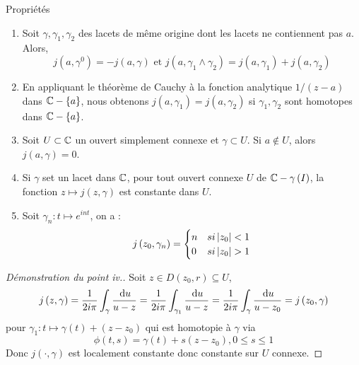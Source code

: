 \documentclass{cours}
\begin{document}
\begin{propositionfr}{Propriétés}{}
    \begin{enumerate}
        \item Soit $\gamma, \gamma_{1}, \gamma_{2}$ des lacets de même origine dont les lacets ne contiennent pas $a$. Alors,
        \begin{equation*}
            j\left(a, \gamma^{0}\right) = -j\left(a, \gamma\right) \text{ et } j\left(a, \gamma_{1} \land \gamma_{2}\right) = j\left(a, \gamma_{1}\right) + j\left(a, \gamma_{2}\right)
        \end{equation*}
        \item En appliquant le théorème de Cauchy à la fonction analytique $1/\left(z - a\right)$ dans $\mathbb{C} - \{a\}$, nous obtenons $j\left(a, \gamma_{1}\right) = j\left(a, \gamma_{2}\right)$ si $\gamma_{1}, \gamma_{2}$ sont homotopes dans $\mathbb{C} - \{a\}$.
        \item Soit $U \subset \mathbb{C}$ un ouvert simplement connexe et $\gamma \subset U$. Si $a \notin U$, alors $j\left(a, \gamma\right) = 0$.
        \item Si $\gamma$ set un lacet dans $\mathbb{C}$, pour tout ouvert connexe $U$ de $\mathbb{C} - \gamma\left(I\right)$, la fonction $z \mapsto j\left(z, \gamma\right)$ est constante dans $U$.
        \item Soit $\gamma_{n} : t \mapsto e^{int}$, on a : 
        \begin{equation*}
            j\left(z_{0}, \gamma_{n}\right) = \begin{cases}
                n & si \left|z_{0}\right| < 1\\
                0 & si \left|z_{0}\right| > 1
            \end{cases}
        \end{equation*}
    \end{enumerate}
\end{propositionfr}
\begin{proof}[Démonstration du point iv.]
    Soit $z \in D\left(z_{0}, r\right) \subseteq U$, 
    \begin{equation*}
        j\left(z, \gamma\right) = \frac{1}{2i\pi}\int_{\gamma}\frac{{\rm \, d} u}{u - z} = \frac{1}{2i\pi}\int_{\gamma_{1}}\frac{{\rm \, d} u}{u - z} = \frac{1}{2i\pi}\int_{\gamma}\frac{{\rm \, d} u}{u - z_{0}} = j\left(z_{0}, \gamma\right)
    \end{equation*}
    pour $\gamma_{1} : t \mapsto \gamma\left(t\right) + \left(z - z_{0}\right)$ qui est homotopie à $\gamma$ via 
    \begin{equation*}
        \phi\left(t, s\right) = \gamma\left(t\right) + s\left(z - z_{0}\right), 0 \leq s \leq 1
    \end{equation*}
    Donc $j\left(\cdot, \gamma\right)$ est localement constante donc constante sur $U$ connexe. 
\end{proof}
\end{document}
